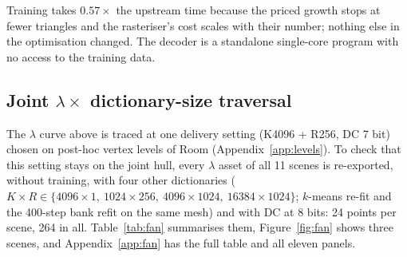 \documentclass[11pt,a4paper]{article}
\begin{document}
Training takes $0.57\times$ the upstream time because the priced growth stops at fewer triangles and the rasteriser's cost scales with their number; nothing else in the optimisation changed. The decoder is a standalone single-core program with no access to the training data.

\subsection{Joint $\lambda \times$ dictionary-size traversal}
\label{sec:fan}

The $\lambda$ curve above is traced at one delivery setting (K4096 + R256, DC 7 bit) chosen on post-hoc vertex levels of Room (Appendix~\ref{app:levels}). To check that this setting stays on the joint hull, every $\lambda$ asset of all 11 scenes is re-exported, without training, with four other dictionaries ($K\times R \in \{4096\times1,\ 1024\times256,\ 4096\times1024,\ 16384\times1024\}$; $k$-means re-fit and the 400-step bank refit on the same mesh) and with DC at 8 bits: 24 points per scene, 264 in all. Table~\ref{tab:fan} summarises them, Figure~\ref{fig:fan} shows three scenes, and Appendix~\ref{app:fan} has the full table and all eleven panels.
\end{document}
